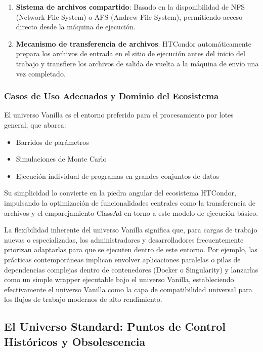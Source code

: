 \begin{enumerate}
	\item \textbf{Sistema de archivos compartido}: Basado en la disponibilidad de NFS (Network File System) o AFS (Andrew File System), permitiendo acceso directo desde la máquina de ejecución.

	\item \textbf{Mecanismo de transferencia de archivos}: HTCondor automáticamente prepara los archivos de entrada en el sitio de ejecución antes del inicio del trabajo y transfiere los archivos de salida de vuelta a la máquina de envío una vez completado.
\end{enumerate}

\subsubsection{Casos de Uso Adecuados y Dominio del Ecosistema}

El universo Vanilla es el entorno preferido para el procesamiento por lotes general, que abarca:

\begin{itemize}
	\item Barridos de parámetros
	\item Simulaciones de Monte Carlo
	\item Ejecución individual de programas en grandes conjuntos de datos
\end{itemize}

Su simplicidad lo convierte en la piedra angular del ecosistema HTCondor, impulsando la optimización de funcionalidades centrales como la transferencia de archivos y el emparejamiento ClassAd en torno a este modelo de ejecución básico.

La flexibilidad inherente del universo Vanilla significa que, para cargas de trabajo nuevas o especializadas, los administradores y desarrolladores frecuentemente priorizan adaptarlas para que se ejecuten dentro de este entorno. Por ejemplo, las prácticas contemporáneas implican envolver aplicaciones paralelas o pilas de dependencias complejas dentro de contenedores (Docker o Singularity) y lanzarlas como un simple wrapper ejecutable bajo el universo Vanilla, estableciendo efectivamente el universo Vanilla como la capa de compatibilidad universal para los flujos de trabajo modernos de alto rendimiento.

\subsection{El Universo Standard: Puntos de Control Históricos y Obsolescencia}


